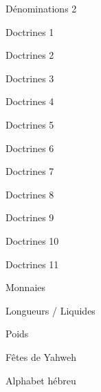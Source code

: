 \documentclass[10pt]{book}
\begin{document}
\begin{spacing}{0.8}
\begin{center}Dénominations 2\end{center}\clearpage
{}\clearpage
\begin{center}Doctrines 1\end{center}\clearpage
\begin{center}Doctrines 2\end{center}\clearpage
\begin{center}Doctrines 3\end{center}\clearpage
\begin{center}Doctrines 4\end{center}\clearpage
\begin{center}Doctrines 5\end{center}\clearpage
\begin{center}Doctrines 6\end{center}\clearpage
\begin{center}Doctrines 7\end{center}\clearpage
\begin{center}Doctrines 8\end{center}\clearpage
\begin{center}Doctrines 9\end{center}\clearpage
\begin{center}Doctrines 10\end{center}\clearpage
\begin{center}Doctrines 11\end{center}\clearpage
{}\clearpage
\begin{center}Monnaies\end{center}\clearpage
{}\clearpage
\begin{center}Longueurs / Liquides\end{center}\clearpage
{}\clearpage
\begin{center}Poids\end{center}\clearpage
{}\clearpage
\begin{center}Fêtes de Yahweh\end{center}\clearpage
{}\clearpage
\begin{center}Alphabet hébreu\end{center}\clearpage
\end{spacing}
\end{document}
